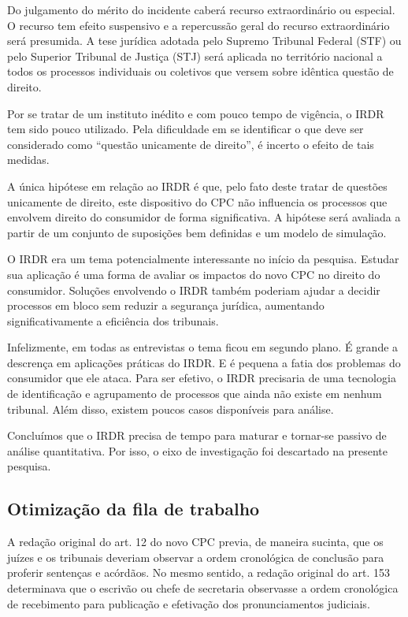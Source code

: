 \documentclass[]{report}
\begin{document}
Do julgamento do mérito do incidente caberá recurso extraordinário ou
especial. O recurso tem efeito suspensivo e a repercussão geral do
recurso extraordinário será presumida. A tese jurídica adotada pelo
Supremo Tribunal Federal (STF) ou pelo Superior Tribunal de Justiça
(STJ) será aplicada no território nacional a todos os processos
individuais ou coletivos que versem sobre idêntica questão de direito.

Por se tratar de um instituto inédito e com pouco tempo de vigência, o
IRDR tem sido pouco utilizado. Pela dificuldade em se identificar o que
deve ser considerado como ``questão unicamente de direito'', é incerto o
efeito de tais medidas.

A única hipótese em relação ao IRDR é que, pelo fato deste tratar de
questões unicamente de direito, este dispositivo do CPC não influencia
os processos que envolvem direito do consumidor de forma significativa.
A hipótese será avaliada a partir de um conjunto de suposições bem
definidas e um modelo de simulação.

O IRDR era um tema potencialmente interessante no início da pesquisa.
Estudar sua aplicação é uma forma de avaliar os impactos do novo CPC no
direito do consumidor. Soluções envolvendo o IRDR também poderiam ajudar
a decidir processos em bloco sem reduzir a segurança jurídica,
aumentando significativamente a eficiência dos tribunais.

Infelizmente, em todas as entrevistas o tema ficou em segundo plano. É
grande a descrença em aplicações práticas do IRDR. E é pequena a fatia
dos problemas do consumidor que ele ataca. Para ser efetivo, o IRDR
precisaria de uma tecnologia de identificação e agrupamento de processos
que ainda não existe em nenhum tribunal. Além disso, existem poucos
casos disponíveis para análise.

Concluímos que o IRDR precisa de tempo para maturar e tornar-se passivo
de análise quantitativa. Por isso, o eixo de investigação foi descartado
na presente pesquisa.

\subsection{Otimização da fila de
trabalho}\label{otimizacao-da-fila-de-trabalho}

A redação original do art. 12 do novo CPC previa, de maneira sucinta,
que os juízes e os tribunais deveriam observar a ordem cronológica de
conclusão para proferir sentenças e acórdãos. No mesmo sentido, a
redação original do art. 153 determinava que o escrivão ou chefe de
secretaria observasse a ordem cronológica de recebimento para publicação
e efetivação dos pronunciamentos judiciais.
\end{document}
